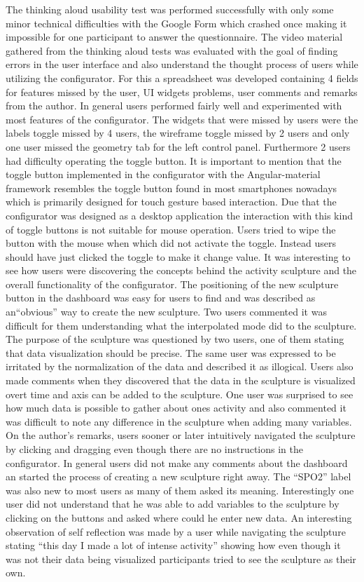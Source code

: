 \documentclass[../medieninformatik-arbeit.tex]{subfiles}
\begin{document}
The thinking aloud usability test was performed successfully with only some minor technical difficulties with the Google Form which crashed once making it impossible for one participant to answer the questionnaire. The video material gathered from the thinking aloud tests was evaluated with the goal of finding errors in the user interface and also understand the thought process of users while utilizing the configurator. For this a spreadsheet was developed containing 4 fields for features missed by the user, UI widgets problems, user comments and remarks from the author. In general users performed fairly well and experimented with most features of the configurator. The widgets that were missed by users were the labels toggle missed by 4 users, the wireframe toggle missed by 2 users and only one user missed the geometry tab for the left control panel. Furthermore 2 users had difficulty operating the toggle button. It is important to mention that the toggle button implemented in the configurator with the Angular-material framework resembles the toggle button found in most smartphones nowadays which is primarily designed for touch gesture based interaction. Due that the configurator was designed as a desktop application the interaction with this kind of toggle buttons is not suitable for mouse operation. Users tried to wipe the button with the mouse when which did not activate the toggle. Instead users should have just clicked the toggle to make it change value. It was interesting to see how users were discovering the concepts behind the activity sculpture and the overall functionality of the configurator. The positioning of the new sculpture button in the dashboard was easy for users to find and was described as an``obvious'' way to create the new sculpture. Two users commented it was difficult for them understanding what the interpolated mode did to the sculpture. The purpose of the sculpture was questioned by two users, one of them stating that data visualization should be precise. The same user was expressed to be irritated by the normalization of the data and described it as illogical. Users also made comments when they discovered that the data in the sculpture is visualized overt time and axis can be added to the sculpture. One user was surprised to see how much data is possible to gather about ones activity and also commented it was difficult to note any difference in the sculpture when adding many variables. On the author's remarks, users sooner or later intuitively navigated the sculpture by clicking and dragging even though there are no instructions in the configurator. In general users did not make any comments about the dashboard an started the process of creating a new sculpture right away. The ``SPO2'' label was also new to most users as many of them asked its meaning. Interestingly one user did not understand that he was able to add variables to the sculpture by clicking on the buttons and asked where could he enter new data. An interesting observation of self reflection was made by a user while navigating the sculpture stating ``this day I made a lot of intense activity'' showing how even though it was not their data being visualized participants tried to see the sculpture as their own. 
\end{document}
